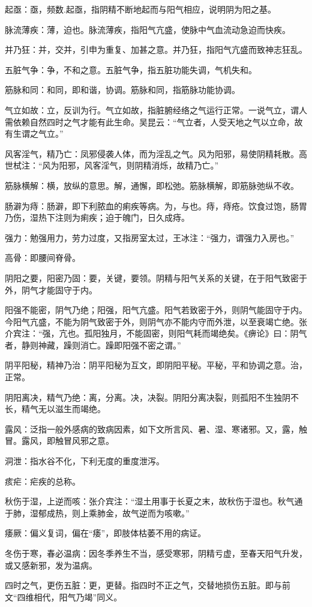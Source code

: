 \documentclass[draft,12pt]{ctexbook}
\begin{document}
\begin{jiaozhu}
	\item 起亟：亟，频数.起亟，指阴精不断地起而与阳气相应，说明阴为阳之基。
	\item 脉流薄疾：薄，迫也。脉流薄疾，指阳气亢盛，使脉中气血流动急迫而快疾。
	\item 并乃狂：并，交并，引申为重复、加甚之意。并乃狂，指阳气亢盛而致神志狂乱。
	\item 五脏气争：争，不和之意。五脏气争，指五脏功能失调，气机失和。
	\item 筋脉和同：和同，即和谐，协调。筋脉和同，指筋脉功能协调。
	\item 气立如故：立，反训为行。气立如故，指脏腑经络之气运行正常。一说气立，谓人需依赖自然四时之气才能有此生命。吴昆云：“气立者，人受天地之气以立命，故有生谓之气立。”
	\item 风客淫气，精乃亡：凤邪侵袭人体，而为淫乱之气。风为阳邪，易使阴精耗散。高世栻注：“风为阳邪，风客淫气，则阴精消烁，故精乃亡。”
	\item 筋脉横解：横，放纵的意思。解，通懈，即松弛。筋脉横解，即筋脉弛纵不收。
	\item 肠澼为痔：肠澼，即下利脓血的痢疾等病。为，与也。痔，痔疮。饮食过饱，肠胃乃伤，湿热下注则为痢疾；迫于魄门，日久成痔。
	\item 强力：勉强用力，劳力过度，又指房室太过，王冰注：“强力，谓强力入房也。”
	\item 高骨：即腰间脊骨。
	\item 阴阳之要，阳密乃固：要，关键，要领。阴精与阳气关系的关键，在于阳气致密于外，阴气才能固守于内。
	\item 阳强不能密，阴气乃绝；阳强，阳气亢盛。阳气若致密于外，则阴气能固守于内。今阳气亢盛，不能为阴气致密于外，则阴气亦不能内守而外泄，以至衰竭亡绝。张介宾注：“强，亢也。孤阳独月，不能固密，则阳气耗而竭绝矣。《痹论》曰：阴气者，静则神藏，躁则消亡。躁即阳强不密之谓。”
	\item 阴平阳秘，精神乃治：阴平阳秘为互文，即阴阳平秘。平秘，平和协调之意。治，正常。
	\item 阴阳离决，精气乃绝：离，分离。决，决裂。阴阳分离决裂，则孤阳不生独阴不长，精气无以滋生而竭绝。
	\item 露风：泛指一般外感病的致病因素，如下文所言风、暑、湿、寒诸邪。又，露，触冒。露风，即触冒风邪之意。
	\item 洞泄：指水谷不化，下利无度的重度泄泻。
	\item 痎疟：疟疾的总称。
	\item 秋伤于湿，上逆而咳：张介宾注：“湿土用事于长夏之末，故秋伤于湿也。秋气通于肺，湿郁成热，则上乘肺金，故气逆而为咳嗽。”
	\item 痿厥：偏义复词，偏在“痿”，即肢体枯萎不用的病证。
	\item 冬伤于寒，春必温病：因冬季养生不当，感受寒邪，阴精亏虚，至春天阳气升发，或又感新邪，发为温病。
	\item 四时之气，更伤五脏：更，更替。指四时不正之气，交替地损伤五脏。即与前文“四维相代，阳气乃竭”同义。
\end{jiaozhu}
\end{document}
